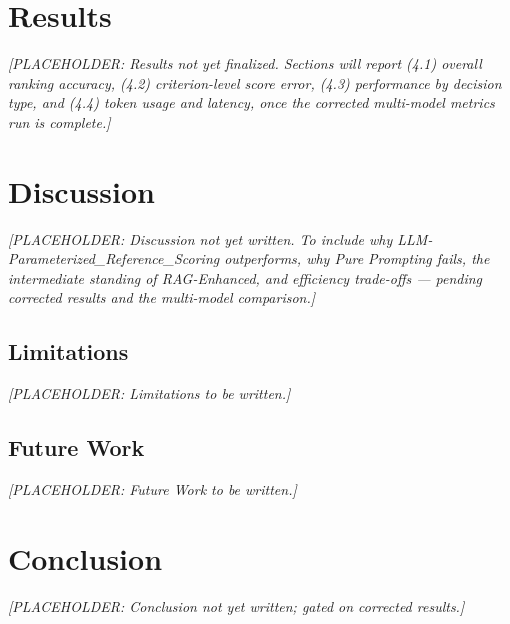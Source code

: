 \documentclass[final,3p,times]{elsarticle}
\begin{document}
\section{Results}
\label{sec:results}

\textit{[PLACEHOLDER: Results not yet finalized. Sections will report (4.1) overall ranking accuracy, (4.2) criterion-level score error, (4.3) performance by decision type, and (4.4) token usage and latency, once the corrected multi-model metrics run is complete.]}

\section{Discussion}
\label{sec:discussion}

\textit{[PLACEHOLDER: Discussion not yet written. To include why LLM-Parameterized\_Reference\_Scoring outperforms, why Pure Prompting fails, the intermediate standing of RAG-Enhanced, and efficiency trade-offs --- pending corrected results and the multi-model comparison.]}

\subsection{Limitations}

\textit{[PLACEHOLDER: Limitations to be written.]}

\subsection{Future Work}

\textit{[PLACEHOLDER: Future Work to be written.]}

\section{Conclusion}
\label{sec:conclusion}

\textit{[PLACEHOLDER: Conclusion not yet written; gated on corrected results.]}

\clearpage


\newpage
\end{document}
